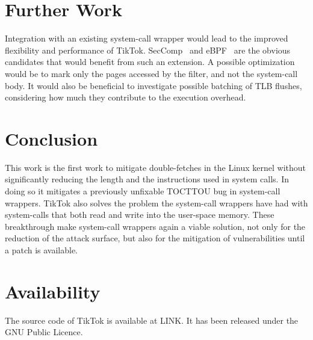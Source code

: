 \documentclass[conference]{IEEEtran}
\newcommand{\sysname}{TikTok}
\begin{document}
\section{Further Work}
\label{sec:furtherwork}
Integration with an existing system-call wrapper would lead to the improved
flexibility and performance of \sysname. SecComp~\cite{seccomp} and
eBPF~\cite{ebpf} are the obvious candidates that would benefit from such an
extension. A possible optimization would be to mark only the pages accessed by
the filter, and not the system-call body. It would also be beneficial to
investigate possible batching of TLB flushes, considering how much they
contribute to the execution overhead.

\section{Conclusion}

This work is the first work to mitigate double-fetches in the Linux kernel
without significantly reducing the length and the instructions used in system
calls. In doing so it mitigates a previously unfixable TOCTTOU bug in
system-call wrappers. TikTok also solves the problem the system-call wrappers
have had with system-calls that both read and write into the user-space memory.
These breakthrough make system-call wrappers again a viable solution, not only
for the reduction of the attack surface, but also for the mitigation of
vulnerabilities until a patch is available.

\section*{Availability}

The source code of TikTok is available at LINK. It has been released under the
GNU Public Licence.




\end{document}
